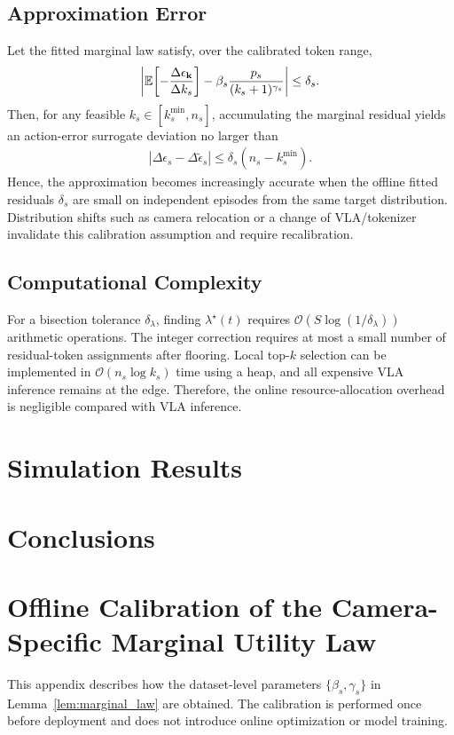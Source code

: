 \documentclass[lettersize,journal]{IEEEtran}
\theoremstyle{custom}
\begin{document}
\subsection{Approximation Error}
Let the fitted marginal law satisfy, over the calibrated token range,
\begin{align}
\left|
\mathbb E\!\left[-\frac{\Delta\epsilon_{\bf k}}{\Delta k_s}\right]
-\beta_s\frac{p_s}{(k_s+1)^{\gamma_s}}
\right|\leq \delta_s.
\end{align}
Then, for any feasible $k_s\in[k_s^{\min},n_s]$, accumulating the marginal residual yields an action-error surrogate deviation no larger than
\begin{align}
    \left|\Delta\epsilon_s-\Delta\widetilde\epsilon_s\right|
    \leq \delta_s\left(n_s-k_s^{\min}\right).
\end{align}
Hence, the approximation becomes increasingly accurate when the offline fitted residuals $\delta_s$ are small on independent episodes from the same target distribution. Distribution shifts such as camera relocation or a change of VLA/tokenizer invalidate this calibration assumption and require recalibration.

\subsection{Computational Complexity}
For a bisection tolerance $\delta_\lambda$, finding $\lambda^\star(t)$ requires $\mathcal O(S\log(1/\delta_\lambda))$ arithmetic operations. The integer correction requires at most a small number of residual-token assignments after flooring. Local top-$k$ selection can be implemented in $\mathcal O(n_s\log k_s)$ time using a heap, and all expensive VLA inference remains at the edge. Therefore, the online resource-allocation overhead is negligible compared with VLA inference.

\section{Simulation Results}

\section{Conclusions}

\appendices
\section{Offline Calibration of the Camera-Specific Marginal Utility Law}\label{app:calibration}
This appendix describes how the dataset-level parameters $\{\beta_s,\gamma_s\}$ in Lemma~\ref{lem:marginal_law} are obtained. The calibration is performed once before deployment and does not introduce online optimization or model training.
\end{document}
